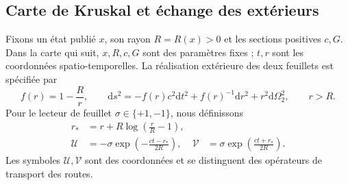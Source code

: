\subsection{Carte de Kruskal et échange des extérieurs}
\label{vii:vii:subsec:kruskal-dos-hojas}

Fixons un état publié \(x\), son rayon \(R=R(x)>0\) et les
sections positives \(c,G\). Dans la carte qui suit, \(x,R,c,G\)
sont des paramètres fixes ; \(t,r\) sont les coordonnées spatio-temporelles.
La réalisation extérieure des deux feuillets est spécifiée par
\begin{equation}
 f(r)=1-\frac Rr,\qquad
 \mathrm ds^2=-f(r)c^2\mathrm dt^2+f(r)^{-1}\mathrm dr^2
                 +r^2\mathrm d\Omega_2^2,\qquad r>R.
 \label{vii:vii:eq:metrica-exterior}
\end{equation}
Pour le lecteur de feuillet \(\sigma\in\{+1,-1\}\), nous définissons
\begin{align}
 r_*&=r+R\log\left(\frac rR-1\right),\\
 \mathcal U&=-\sigma\exp\left(-\frac{ct-r_*}{2R}\right),&
 \mathcal V&=\sigma\exp\left(\frac{ct+r_*}{2R}\right).
 \label{vii:vii:eq:carta-kruskal}
\end{align}
Les symboles \(\mathcal U,\mathcal V\) sont des coordonnées et se
distinguent des opérateurs de transport des routes.

